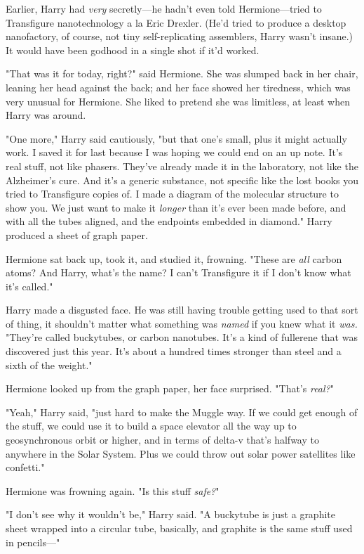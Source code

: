 Earlier, Harry had \emph{very} secretly---he hadn't even told Hermione---tried 
to Transfigure nanotechnology a la Eric Drexler. (He'd tried to produce a 
desktop nanofactory, of course, not tiny self-replicating assemblers, Harry 
wasn't insane.) It would have been godhood in a single shot if it'd worked.

"That was it for today, right?" said Hermione. She was slumped back in her 
chair, leaning her head against the back; and her face showed her tiredness, 
which was very unusual for Hermione. She liked to pretend she was limitless, at 
least when Harry was around.

"One more," Harry said cautiously, "but that one's small, plus it might 
actually work. I saved it for last because I was hoping we could end on an up 
note. It's real stuff, not like phasers. They've already made it in the 
laboratory, not like the Alzheimer's cure. And it's a generic substance, not 
specific like the lost books you tried to Transfigure copies of. I made a 
diagram of the molecular structure to show you. We just want to make it 
\emph{longer} than it's ever been made before, and with all the tubes aligned, 
and the endpoints embedded in diamond." Harry produced a sheet of graph paper.

Hermione sat back up, took it, and studied it, frowning. "These are \emph{all} 
carbon atoms? And Harry, what's the name? I can't Transfigure it if I don't 
know what it's called."

Harry made a disgusted face. He was still having trouble getting used to that 
sort of thing, it shouldn't matter what something was \emph{named} if you knew 
what it \emph{was.} "They're called buckytubes, or carbon nanotubes. It's a 
kind of fullerene that was discovered just this year. It's about a hundred 
times stronger than steel and a sixth of the weight."

Hermione looked up from the graph paper, her face surprised. "That's 
\emph{real?}"

"Yeah," Harry said, "just hard to make the Muggle way. If we could get enough 
of the stuff, we could use it to build a space elevator all the way up to 
geosynchronous orbit or higher, and in terms of delta-v that's halfway to 
anywhere in the Solar System. Plus we could throw out solar power satellites 
like confetti."

Hermione was frowning again. "Is this stuff \emph{safe?}"

"I don't see why it wouldn't be," Harry said. "A buckytube is just a graphite 
sheet wrapped into a circular tube, basically, and graphite is the same stuff 
used in pencils---"

